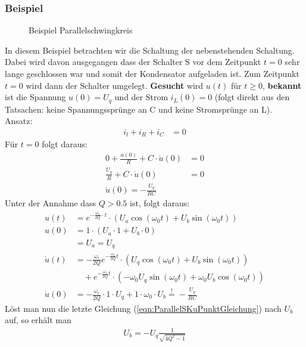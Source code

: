 \subsubsection{Beispiel}
\begin{wrapfigure}{l}{0.5\textwidth}
	\centering
	
	\caption{Beispiel Parallelschwingkreis}
	\label{fig:ParallelSkBsp}
\end{wrapfigure}
In diesem Beispiel betrachten wir die Schaltung der nebenstehenden Schaltung.
Dabei wird davon ausgegangen dass der Schalter S vor dem Zeitpunkt $t = 0$ sehr
lange geschlossen war und somit der Kondensator aufgeladen ist. Zum Zeitpunkt
$t=0$ wird dann der Schalter umgelegt. \textbf{Gesucht} wird $u(t)$ für $t \geq
0$, \textbf{bekannt} ist die Spannung $u(0) = U_q$ und der Strom $i_L(0) = 0$
(folgt direkt aus den Tatsachen: keine Spannungssprünge an C und keine
Stromsprünge an L). \\

Ansatz:
\begin{align*}
i_l + i_R + i_C &= 0
\end{align*}
Für $t=0$ folgt daraus:
\begin{align}
0 + \frac{u(0)}{R} + C \cdot \dot{u}(0) &= 0 \nonumber \\
\frac{U_q}{R} + C \cdot \dot{u}(0) &= 0 \nonumber \\
\boxed{\dot{u}(0) = -\frac{U_q}{RC}}
\end{align}
Unter der Annahme dass $Q > 0.5$ ist, folgt daraus:
\begin{align}
u(t) &= e^{-\frac{\omega_r}{2Q}\cdot t} \cdot \left(U_a \cos(\omega_0 t) + U_b
\sin(\omega_0 t) \right) \nonumber \\
u(0) &= 1 \cdot \left(U_a \cdot 1 + U_b \cdot 0 \right) \nonumber \\
&\boxed{= U_a = U_q} \\
\dot{u}(t) &= -\frac{\omega_r}{2Q} e^{-\frac{\omega_r}{2Q}t} \cdot \left(
U_q \cos(\omega_0 t) + U_b \sin(\omega_0 t)\right) \nonumber \\
&\quad + e^{-\frac{\omega_r}{2Q}t} \cdot \left( -\omega_0 U_q
\sin(\omega_0 t) + \omega_0 U_b \cos(\omega_0 t)\right) \nonumber \\
\dot{u}(0) &= -\frac{\omega_r}{2Q} \cdot 1 \cdot U_q + 1 \cdot \omega_0 \cdot
U_b \overset{!}{=} -\frac{U_q}{RC} \label{eqn:ParallelSKuPunktGleichung}
\end{align}
Löst man nun die letzte Gleichung (\ref{eqn:ParallelSKuPunktGleichung}) nach
$U_b$ auf, so erhält man
\begin{align}
\boxed{U_b = -U_q \frac{1}{\sqrt{4Q^2-1}}}
\end{align}
